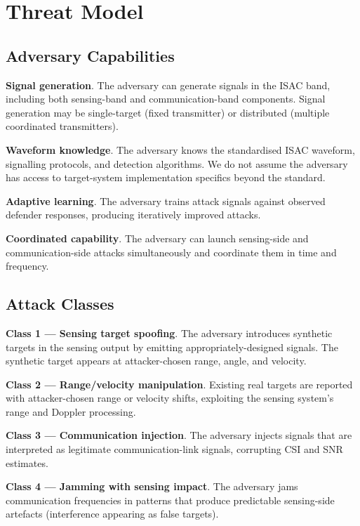 \documentclass[sigconf,nonacm]{acmart}
\begin{document}
\section{Threat Model}

\subsection{Adversary Capabilities}

\textbf{Signal generation}. The adversary can generate signals
in the ISAC band, including both sensing-band and
communication-band components. Signal generation may be
single-target (fixed transmitter) or distributed (multiple
coordinated transmitters).

\textbf{Waveform knowledge}. The adversary knows the
standardised ISAC waveform, signalling protocols, and detection
algorithms. We do not assume the adversary has access to
target-system implementation specifics beyond the standard.

\textbf{Adaptive learning}. The adversary trains attack signals
against observed defender responses, producing iteratively
improved attacks.

\textbf{Coordinated capability}. The adversary can launch
sensing-side and communication-side attacks simultaneously and
coordinate them in time and frequency.

\subsection{Attack Classes}

\textbf{Class 1 --- Sensing target spoofing}. The adversary
introduces synthetic targets in the sensing output by emitting
appropriately-designed signals. The synthetic target appears at
attacker-chosen range, angle, and velocity.

\textbf{Class 2 --- Range/velocity manipulation}. Existing real
targets are reported with attacker-chosen range or velocity
shifts, exploiting the sensing system's range and Doppler
processing.

\textbf{Class 3 --- Communication injection}. The adversary
injects signals that are interpreted as legitimate
communication-link signals, corrupting CSI and SNR estimates.

\textbf{Class 4 --- Jamming with sensing impact}. The adversary
jams communication frequencies in patterns that produce
predictable sensing-side artefacts (interference appearing as
false targets).
\end{document}
